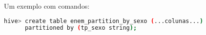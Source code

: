Um exemplo com comandos:

\begin{lstlisting}[language=bash]
hive> create table enem_partition_by_sexo (...colunas...) 
	  partitioned by (tp_sexo string);
\end{lstlisting}